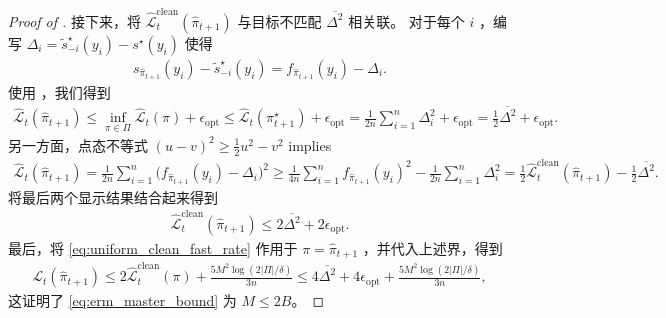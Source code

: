 \documentclass{article}
\theoremstyle{plain}
\theoremstyle{definition}
\theoremstyle{remark}
\newcommand{\abs}[1]{\left|#1\right|}
\begin{document}
\begin{proof}[Proof of ]
    接下来，将 $\widehat{\mathcal{L}}^{\mathrm{clean}}_t(\widehat{\pi}_{t+1})$ 与目标不匹配 $\overline{\Delta^2}$ 相关联。  
对于每个 $i$ ，编写 $\Delta_i=\widetilde{s}^\star_{-i}(y_i)-s^\star(y_i)$ 使得
    \begin{align*}
        s_{\widehat{\pi}_{t+1}}(y_i)-\widetilde{s}^\star_{-i}(y_i) =f_{\widehat{\pi}_{t+1}}(y_i)-\Delta_i.
    \end{align*}
    使用 ，我们得到 
    \begin{align*}
        \widehat{\mathcal{L}}_t(\widehat{\pi}_{t+1})
        \leq\inf_{\pi\in\Pi}\widehat{\mathcal{L}}_t(\pi)+\epsilon_{\mathrm{opt}}
        \leq\widehat{\mathcal{L}}_t(\pi^\star_{t+1})+\epsilon_{\mathrm{opt}}
        =\frac{1}{2n}\sum_{i=1}^n \Delta_i^2+\epsilon_{\mathrm{opt}}
        =\frac{1}{2}\overline{\Delta^2}+\epsilon_{\mathrm{opt}}.
    \end{align*}
    另一方面，点态不等式 $(u-v)^2\ge \frac{1}{2} u^2-v^2$  implies
    \begin{align*}
        \widehat{\mathcal{L}}_t(\widehat{\pi}_{t+1})
        =\frac{1}{2n}\sum_{i=1}^n \big(f_{\widehat{\pi}_{t+1}}(y_i)-\Delta_i\big)^2
        \geq\frac{1}{4n}\sum_{i=1}^n f_{\widehat{\pi}_{t+1}}(y_i)^2-\frac{1}{2n}\sum_{i=1}^n \Delta_i^2
        =\frac{1}{2}\widehat{\mathcal{L}}^{\mathrm{clean}}_t(\widehat{\pi}_{t+1}) -\frac{1}{2}\overline{\Delta^2}.
    \end{align*}
    将最后两个显示结果结合起来得到
    \begin{align*}
        \widehat{\mathcal{L}}^{\mathrm{clean}}_t(\widehat{\pi}_{t+1})
        \leq 2\overline{\Delta^2}+2\epsilon_{\mathrm{opt}}.
    \end{align*}
    最后，将 \eqref{eq:uniform_clean_fast_rate} 作用于 $\pi=\widehat{\pi}_{t+1}$ ，并代入上述界，得到
    \begin{align*}
        \mathcal{L}_t(\widehat{\pi}_{t+1})
        \leq 2\widehat{\mathcal{L}}^{\mathrm{clean}}_t(\pi)+\frac{5M^2\log(2\abs{\Pi}/\delta)}{3n}
        \leq 4\overline{\Delta^2}+4\epsilon_{\mathrm{opt}}+\frac{5M^2\log(2\abs{\Pi}/\delta)}{3n},
    \end{align*}
    这证明了 \eqref{eq:erm_master_bound} 为 $M\leq 2B$。
\end{proof}
\end{document}
